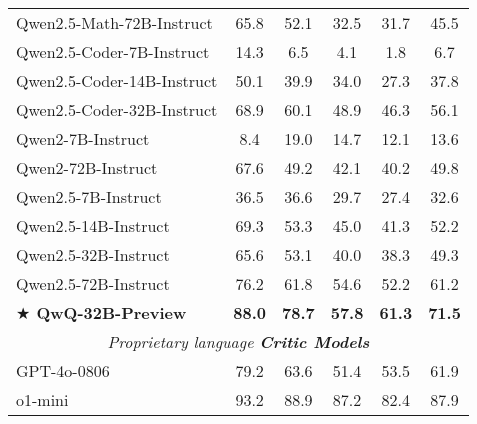\documentclass[letterpaper]{article} %
\begin{document}
\begin{table*}[!ht]
{\begin{tabular}{lccccc}
    \rowcolor[rgb]{ .882,  .949,  .89} Qwen2.5-Math-72B-Instruct & 65.8  & 52.1  & 32.5  & 31.7  & 45.5  \\
    \rowcolor[rgb]{ .882,  .933,  .933} Qwen2.5-Coder-7B-Instruct & 14.3  & 6.5   & 4.1   & 1.8   & 6.7  \\
    \rowcolor[rgb]{ .882,  .933,  .933} Qwen2.5-Coder-14B-Instruct & 50.1  & 39.9  & 34.0  & 27.3  & 37.8  \\
    \rowcolor[rgb]{ .882,  .933,  .933} Qwen2.5-Coder-32B-Instruct & 68.9  & 60.1  & 48.9  & 46.3  & 56.1  \\
    \rowcolor[rgb]{ .882,  .922,  .969} Qwen2-7B-Instruct & 8.4   & 19.0  & 14.7  & 12.1  & 13.6  \\
    \rowcolor[rgb]{ .882,  .922,  .969} Qwen2-72B-Instruct & 67.6  & 49.2  & 42.1  & 40.2  & 49.8  \\
    \rowcolor[rgb]{ .89,  .89,  .969} Qwen2.5-7B-Instruct & 36.5  & 36.6  & 29.7  & 27.4  & 32.6  \\
    \rowcolor[rgb]{ .89,  .89,  .969} Qwen2.5-14B-Instruct & 69.3  & 53.3  & 45.0  & 41.3  & 52.2  \\
    \rowcolor[rgb]{ .89,  .89,  .969} Qwen2.5-32B-Instruct & 65.6  & 53.1  & 40.0  & 38.3  & 49.3  \\
    \rowcolor[rgb]{ .89,  .89,  .969} Qwen2.5-72B-Instruct & 76.2  & 61.8  & 54.6  & 52.2  & 61.2  \\
    \rowcolor[rgb]{ .949,  .89,  .988} \boldmath{}\textbf{$\bigstar$ QwQ-32B-Preview}\unboldmath{} & \textbf{88.0} & \textbf{78.7} & \textbf{57.8} & \textbf{61.3} & \textbf{71.5} \\ \midrule
\multicolumn{6}{c}{\textit{Proprietary language \textbf{Critic Models}}} \\ \midrule
\rowcolor[rgb]{ .906,  .902,  .902} GPT-4o-0806 & 79.2  & 63.6  & 51.4  & 53.5  & 61.9  \\
    \rowcolor[rgb]{ .816,  .808,  .808} o1-mini & 93.2  & 88.9  & 87.2  & 82.4  & 87.9  \\ \bottomrule \end{tabular} } \end{table*}%
\end{document}

